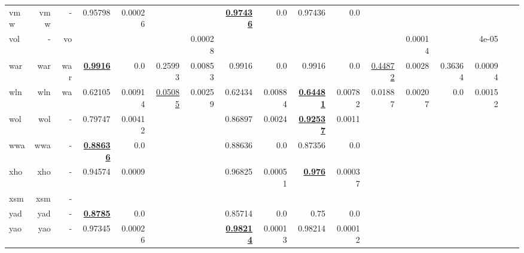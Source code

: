 \documentclass[11pt]{article}
\begin{document}
\begin{table*}[h]
{\begin{tabular}{lrrrrrrrrrrrrrrrr}
vmw         & vmw         & -         & 0.95798         & 0.00026         &          &          & \textbf{\underline{0.97436}}         & 0.0         & 0.97436         & 0.0         &          &          &          &          \\
vol         & -         & vo         &          &          &          & 0.00028         &          &          &          &          &          & 0.00014         &          & 4e-05         \\
war         & war         & war         & \textbf{\underline{0.9916}}         & 0.0         & 0.25993         & 0.00853         & 0.9916         & 0.0         & 0.9916         & 0.0         & \underline{0.44872}         & 0.0028         & 0.36364         & 0.00094         \\
wln         & wln         & wa         & 0.62105         & 0.00914         & \underline{0.05085}         & 0.00259         & 0.62434         & 0.00884         & \textbf{\underline{0.64481}}         & 0.00782         & 0.01887         & 0.00207         & 0.0         & 0.00152         \\
wol         & wol         & -         & 0.79747         & 0.00412         &          &          & 0.86897         & 0.0024         & \textbf{\underline{0.92537}}         & 0.0011         &          &          &          &          \\
wwa         & wwa         & -         & \textbf{\underline{0.88636}}         & 0.0         &          &          & 0.88636         & 0.0         & 0.87356         & 0.0         &          &          &          &          \\
xho         & xho         & -         & 0.94574         & 0.0009         &          &          & 0.96825         & 0.00051         & \textbf{\underline{0.976}}         & 0.00037         &          &          &          &          \\
xsm         & xsm         & -         &          &          &          &          &          &          &          &          &          &          &          &          \\
yad         & yad         & -         & \textbf{\underline{0.8785}}         & 0.0         &          &          & 0.85714         & 0.0         & 0.75         & 0.0         &          &          &          &          \\
yao         & yao         & -         & 0.97345         & 0.00026         &          &          & \textbf{\underline{0.98214}}         & 0.00013         & 0.98214         & 0.00012         &          &          &          &          \\

\end{tabular}}
\end{table*}
\end{document}
